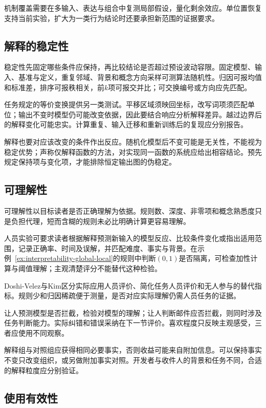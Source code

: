 机制覆盖需要在多输入、表达与组合中复测局部假设，量化剩余效应。单位置恢复支持当前实验，扩大为一类行为结论时还要承担新范围的证据要求。

\subsection{解释的稳定性}
\label{sec:interpretability-quality-stability}

稳定性先固定哪些条件应保持，再比较结论是否超过预设波动容限。固定模型、输入、基准与定义，重复邻域、背景和概念方向采样可测算法随机性。归因可报均值和标准差，排序可报秩相关，前$k$项可报交并比；可交换编号或方向应先匹配。

任务规定的等价变换提供另一类测试。平移区域须映回坐标，改写词项须匹配单位；输出不变时模型仍可能改变依据，因此要结合响应分析解释差异。越过边界后的解释变化可能忠实。计算重复、输入迁移和重新训练后的复现应分别报告。

解释也要对应该改变的条件作出反应。随机化模型后不变可能是无关性，不能视为稳定优势；声称仅解释函数的方法，对实现同一函数的系统应给出相容结论。预先规定保持项与变化项，才能排除恒定输出图的伪稳定。

\subsection{可理解性}
\label{sec:interpretability-quality-comprehensibility}

可理解性以目标读者是否正确理解为依据。规则数、深度、非零项和概念熟悉度只是负担代理，短而含糊的规则未必比明确计算更容易理解。

人员实验可要求读者根据解释预测新输入的模型反应、比较条件变化或指出适用范围，记录正确率、时间及误解，并匹配难度、事实与背景。在示例~\ref{ex:interpretability-global-local}的规则中判断$(0,1)$是否隔离，可检查加性计算与阈值理解；主观清楚评分不能替代这种检验。

Doshi-Velez与Kim区分实际应用人员评价、简化任务人员评价和无人参与的替代指标。规则少和归因稀疏便于测量，是否对应实际理解仍需人员任务的证据。

让人预测模型是否拦截，检验对模型的理解；让人判断邮件应否拦截，则同时涉及任务判断能力。实际纠错和错误采纳在下一节评价。喜欢程度只反映主观感受，三者应使用不同观察。

解释组与对照组应获得相同必要事实，否则收益可能来自附加信息。可以保持事实不变只改变组织，或另做附加事实对照。开发者与收件人的背景和任务不同，合适的解释粒度应分别验证。

\subsection{使用有效性}
\label{sec:interpretability-quality-utility}

